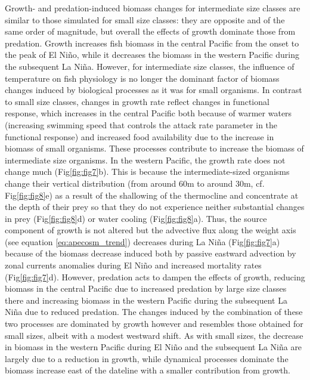 Growth- and predation-induced biomass changes for intermediate size classes are similar to those simulated for small size classes: they are opposite and of the same order of magnitude, but overall the effects of growth dominate those from predation. Growth increases fish biomass in the central Pacific from the onset to the peak of El Niño, while it decreases the biomass in the western Pacific during the subsequent La Niña. However, for intermediate size classes, the influence of temperature on fish physiology is no longer the dominant factor of biomass changes induced by biological processes as it was for small organisms. In contrast to small size classes, changes in growth rate reflect changes in functional response, which increases in the central Pacific both because of warmer waters (increasing swimming speed that controls the attack rate parameter in the functional response) and increased food availability due to the increase in biomass of small organisms. These processes contribute to increase the biomass of intermediate size organisms. In the western Pacific, the growth rate does not change much (Fig\ref{fig:fig7}b). This is because the intermediate-sized organisms change their vertical distribution (from around 60m to around 30m, cf. Fig\ref{fig:fig8}e) as a result of the shallowing of the thermocline and concentrate at the depth of their prey so that they do not experience neither substantial changes in prey  (Fig\ref{fig:fig8}d) or water cooling (Fig\ref{fig:fig8}a). Thus, the source component of growth is not altered but the advective flux along the weight axis (see equation \ref{eq:apecosm_trend}) decreases during La Niña (Fig\ref{fig:fig7}a) because of the biomass decrease induced both by passive eastward advection by zonal currents anomalies during El Niño and increased mortality rates (Fig\ref{fig:fig7}d). However, predation acts to dampen the effects of growth, reducing biomass in the central Pacific due to increased predation by large size classes there and increasing biomass in the western Pacific during the subsequent La Niña due to reduced predation. The changes induced by the combination of these two processes are dominated by growth however and resembles those obtained for small sizes, albeit with a modest westward shift. As with small sizes, the decrease in biomass in the western Pacific during El Niño and the subsequent La Niña are largely due to a reduction in growth, while dynamical processes dominate the biomass increase east of the dateline with a smaller contribution from growth. 

